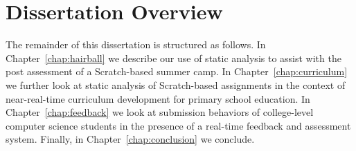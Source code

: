 \section{Dissertation Overview}
The remainder of this dissertation is structured as follows. In
Chapter~\ref{chap:hairball} we describe our use of static analysis to assist
with the post assessment of a Scratch-based summer camp. In
Chapter~\ref{chap:curriculum} we further look at static analysis of
Scratch-based assignments in the context of near-real-time curriculum
development for primary school education. In Chapter~\ref{chap:feedback} we
look at submission behaviors of college-level computer science students in the
presence of a real-time feedback and assessment system. Finally, in
Chapter~\ref{chap:conclusion} we conclude.
